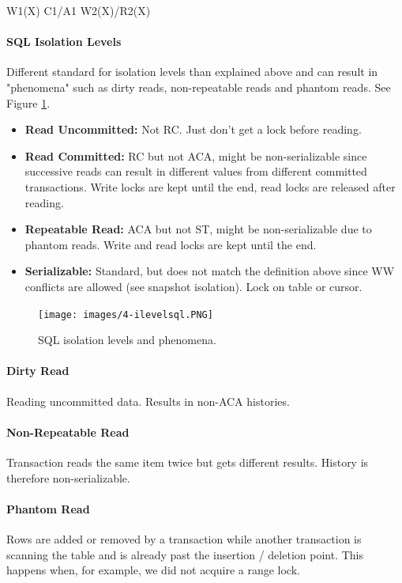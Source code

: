 W1(X) C1/A1 W2(X)/R2(X)


\paragraph{SQL Isolation Levels}
Different standard for isolation levels than explained above and can result in "phenomena" such as dirty reads, non-repeatable reads and phantom reads. See Figure \ref{fig:ilevelsql}.
\begin{itemize}
    \item \textbf{Read Uncommitted:} Not RC. Just don't get a lock before reading.
    \item \textbf{Read Committed:} RC but not ACA, might be non-serializable since successive reads can result in different values from different committed transactions. Write locks are kept until the end, read locks are released after reading.
    \item \textbf{Repeatable Read:} ACA but not ST, might be non-serializable due to phantom reads. Write and read locks are kept until the end.
    \item \textbf{Serializable:} Standard, but does not match the definition above since WW conflicts are allowed (see snapshot isolation). Lock on table or cursor.
\end{itemize}

\begin{figure}[h]
	\centering
	\texttt{[image: images/4-ilevelsql.PNG]}
	\caption{SQL isolation levels and phenomena.}
	\label{fig:ilevelsql}
\end{figure}


\paragraph{Dirty Read}
Reading uncommitted data. Results in non-ACA histories.

\paragraph{Non-Repeatable Read}
Transaction reads the same item twice but gets different results. History is therefore non-serializable.

\paragraph{Phantom Read}
Rows are added or removed by a transaction while another transaction is scanning the table and is already past the insertion / deletion point. This happens when, for example, we did not acquire a range lock.





